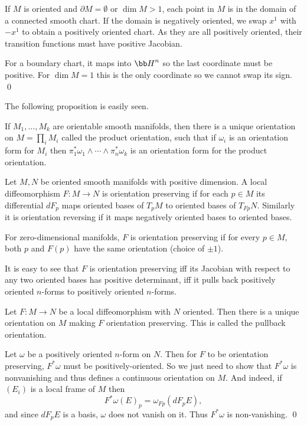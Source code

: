     If $M$ is oriented and $\partial M=\emptyset$ or $\dim M>1$, each point in $M$ is in the domain of a connected smooth chart.
    If the domain is negatively oriented, we swap $x^1$ with $-x^1$ to obtain a positively oriented chart.
    As they are all positively oriented, their transition functions must have positive Jacobian.

    For a boundary chart, it maps into $\bH^n$ so the last coordinate must be positive.
    For $\dim M=1$ this is the only coordinate so we cannot swap its sign.
    \qed

\eproof

The following proposition is easily seen.

\bprop

    If $M_1,\dots,M_k$ are orientable smooth manifolds, then there is a unique orientation on $M=\prod_iM_i$
    called the {\emphcolor product orientation}, such that if $\omega_i$ is an orientation form for $M_i$
    then $\pi_1^*\omega_1\wedge\cdots\wedge\pi_n^*\omega_k$ is an orientation form for the product orientation.

\eprop

\bdefn

    Let $M,N$ be oriented smooth manifolds with positive dimension.
    A local diffeomorphism $F\colon M\to N$ is {\emphcolor orientation preserving} if for each $p\in M$ its differential
    $dF_p$ maps oriented bases of $T_pM$ to oriented bases of $T_{Fp}N$.
    Similarly it is {\emphcolor orientation reversing} if it maps negatively oriented bases to oriented bases.

    For zero-dimensional manifolds, $F$ is orientation preserving if for every $p\in M$, both $p$ and $F(p)$ have the same
    orientation (choice of $\pm1$).

\edefn

It is easy to see that $F$ is orientation preserving iff its Jacobian with respect to any two oriented bases has positive
determinant, iff it pulls back positively oriented $n$-forms to positively oriented $n$-forms.

\bprop

    Let $F\colon M\to N$ be a local diffeomorphism with $N$ oriented.
    Then there is a unique orientation on $M$ making $F$ orientation preserving.
    This is called the {\emphcolor pullback orientation}.

\eprop

\bproof

    Let $\omega$ be a positively oriented $n$-form on $N$.
    Then for $F$ to be orientation preserving, $F^*\omega$ must be positively-oriented.
    So we just need to show that $F^*\omega$ is nonvanishing and thus defines a continuous orientation on $M$.
    And indeed, if $(E_i)$ is a local frame of $M$ then
    $$ F^*\omega(E)_p = \omega_{Fp}(dF_pE) , $$
    and since $dF_pE$ is a basis, $\omega$ does not vanish on it.
    Thus $F^*\omega$ is non-vanishing.
    \qed

